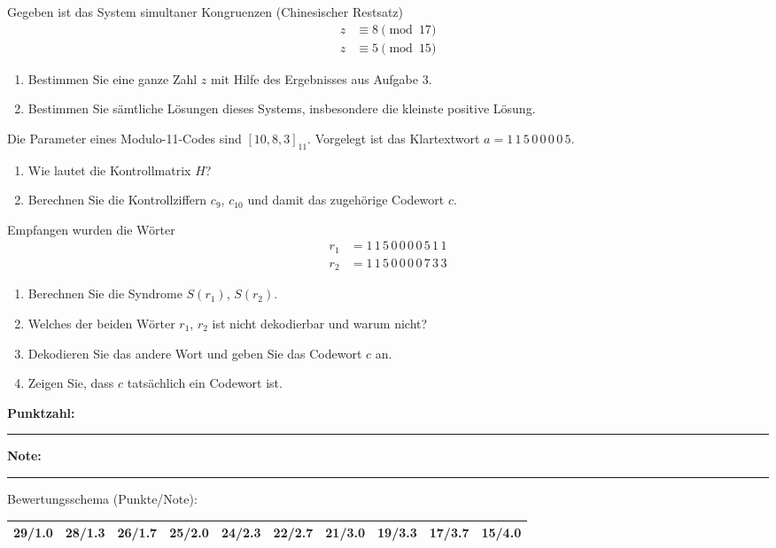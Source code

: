 \begin{aufgabe}
Gegeben ist das System simultaner Kongruenzen (Chinesischer Restsatz)
\begin{align*}
  z &\equiv 8 \pmod{17}\\
  z &\equiv 5 \pmod{15}
\end{align*}
\begin{enumerate}[label=\alph*)]
  \item Bestimmen Sie eine ganze Zahl $z$ mit Hilfe des Ergebnisses aus Aufgabe 3.
  \item Bestimmen Sie sämtliche Lösungen dieses Systems, insbesondere die kleinste positive Lösung.
\end{enumerate}
\end{aufgabe}

\begin{aufgabe}
Die Parameter eines Modulo-11-Codes sind $[10, 8, 3]_{11}$.
Vorgelegt ist das Klartextwort $a = 1\,1\,5\,0\,0\,0\,0\,5$.
\begin{enumerate}[label=\alph*)]
  \item Wie lautet die Kontrollmatrix $H$?
  \item Berechnen Sie die Kontrollziffern $c_9$, $c_{10}$ und damit das zugehörige Codewort $c$.
\end{enumerate}
Empfangen wurden die Wörter
\begin{align*}
  r_1 &= 1\,1\,5\,0\,0\,0\,0\,5\,1\,1\\
  r_2 &= 1\,1\,5\,0\,0\,0\,0\,7\,3\,3
\end{align*}
\begin{enumerate}[label=\alph*), start=3]
  \item Berechnen Sie die Syndrome $S(r_1)$, $S(r_2)$.
  \item Welches der beiden Wörter $r_1$, $r_2$ ist nicht dekodierbar und warum nicht?
  \item Dekodieren Sie das andere Wort und geben Sie das Codewort $c$ an.
  \item Zeigen Sie, dass $c$ tatsächlich ein Codewort ist.
\end{enumerate}
\end{aufgabe}

\vfill
\textbf{Punktzahl:} \rule{3cm}{0.4pt} \qquad \textbf{Note:} \rule{3cm}{0.4pt}

\medskip
Bewertungsschema (Punkte/Note):\\[2pt]
{\small
\begin{tabular}{*{10}{c}}
\toprule
29/1.0 & 28/1.3 & 26/1.7 & 25/2.0 & 24/2.3 & 22/2.7 & 21/3.0 & 19/3.3 & 17/3.7 & 15/4.0\\
\bottomrule
\end{tabular}}


